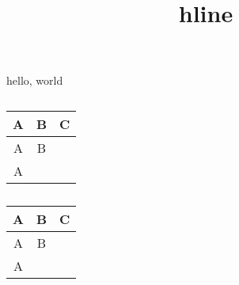\documentclass{amsart}
\title{hline}
\begin{document}
\maketitle

hello, world

\begin{table}[h]
\caption{}
\begin{tabular}{|c|c|c|}
\hline
A & B & C\\\hline
A & B\\\hline
A \\\hline
\end{tabular}
\end{table}

\begin{table}[h]
\caption{}
\begin{tabular}{|c|c|c|}
\hline
A & B & C\\\hline
A & B &\\\hline
A&& \\\hline
\end{tabular}
\end{table}
\end{document}
